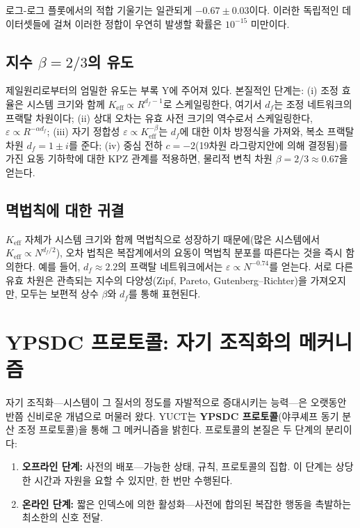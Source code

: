 \documentclass[11pt,a4paper]{article}
\theoremstyle{remark}
\newcommand{\Keff}{K_{\mathrm{eff}}}
\begin{document}
	로그-로그 플롯에서의 적합 기울기는 일관되게 \(-0.67 \pm 0.03\)이다. 이러한 독립적인 데이터셋들에 걸쳐 이러한 정합이 우연히 발생할 확률은 \(10^{-15}\) 미만이다.
	
	\subsection{지수 \(\beta = 2/3\)의 유도}
	
	제일원리로부터의 엄밀한 유도는 부록 Y에 주어져 있다. 본질적인 단계는: (i) 조정 효율은 시스템 크기와 함께 \(\Keff \propto R^{d_f-1}\)로 스케일링한다, 여기서 \(d_f\)는 조정 네트워크의 프랙탈 차원이다; (ii) 상대 오차는 유효 사전 크기의 역수로서 스케일링한다, \(\varepsilon \propto R^{-\alpha d_f}\); (iii) 자기 정합성 \(\varepsilon \propto \Keff^{-\beta}\)는 \(d_f\)에 대한 이차 방정식을 가져와, 복소 프랙탈 차원 \(d_f = 1 \pm i\)를 준다; (iv) 중심 전하 \(c=-2\)(19차원 라그랑지안에 의해 결정됨)를 가진 요동 기하학에 대한 KPZ 관계를 적용하면, 물리적 변칙 차원 \(\beta = 2/3 \approx 0.67\)을 얻는다.
	
	\subsection{멱법칙에 대한 귀결}
	
	\(\Keff\) 자체가 시스템 크기와 함께 멱법칙으로 성장하기 때문에(많은 시스템에서 \(\Keff \propto N^{d_f/2}\)), 오차 법칙은 복잡계에서의 요동이 멱법칙 분포를 따른다는 것을 즉시 함의한다. 예를 들어, \(d_f \approx 2.2\)의 프랙탈 네트워크에서는 \(\varepsilon \propto N^{-0.74}\)를 얻는다. 서로 다른 유효 차원은 관측되는 지수의 다양성(Zipf, Pareto, Gutenberg–Richter)을 가져오지만, 모두는 보편적 상수 \(\beta\)와 \(d_f\)를 통해 표현된다.
	
	\section{YPSDC 프로토콜: 자기 조직화의 메커니즘}
	\label{sec:ypsdc}
	
	자기 조직화—시스템이 그 질서의 정도를 자발적으로 증대시키는 능력—은 오랫동안 반쯤 신비로운 개념으로 머물러 왔다. YUCT는 \textbf{YPSDC 프로토콜}(야쿠셰프 동기 분산 조정 프로토콜)을 통해 그 메커니즘을 밝힌다. 프로토콜의 본질은 두 단계의 분리이다:
	\begin{enumerate}
		\item \textbf{오프라인 단계:} 사전의 배포—가능한 상태, 규칙, 프로토콜의 집합. 이 단계는 상당한 시간과 자원을 요할 수 있지만, 한 번만 수행된다.
		\item \textbf{온라인 단계:} 짧은 인덱스에 의한 활성화—사전에 합의된 복잡한 행동을 촉발하는 최소한의 신호 전달.
	\end{enumerate}
	
\end{document}
